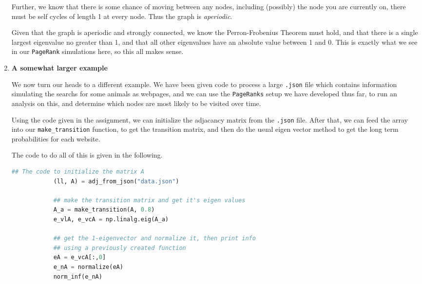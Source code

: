 \documentclass[11pt]{article}
\begin{document}
\begin{enumerate}
        Further, we know that there is some chance of moving between any nodes,
        including (possibly) the node you are currently on, there must be self
        cycles of length 1 at every node. Thus the graph is \textit{aperiodic}.

        Given that the graph is aperiodic and strongly connected, we know the
        Perron-Frobenius Theorem must hold, and that there is a single largest
        eigenvalue no greater than 1, and that all other eigenvalues have an
        absolute value between 1 and 0. This is exactly what we see in our
        \texttt{PageRank} simulations here, so this all makes sense.

    \item \textbf{A somewhat larger example}

        We now turn our heads to a different example. We have been given code
        to process a large \texttt{.json} file which contains information
        simulating the searchs for some animals as webpages, and we can use the
        \texttt{PageRanks} setup we have developed thus far, to run an analysis
        on this, and determine which nodes are most likely to be visited over
        time. 

        Using the code given in the assignment, we can initialize the adjacancy
        matrix from the \texttt{.json} file. After that, we can feed the array
        into our \texttt{make\_transition} function, to get the transition
        matrix, and then do the usual eigen vector method to get the long term
        probabilities for each website.

        The code to do all of this is given in the following.

        \begin{lstlisting}[style=mystyle, linewidth=0.94\linewidth, 
                            language=Python, gobble=8, caption=The analysis]
            ## The code to initialize the matrix A
            (ll, A) = adj_from_json("data.json")

            ## make the transition matrix and get it's eigen values
            A_a = make_transition(A, 0.8)
            e_vlA, e_vcA = np.linalg.eig(A_a)

            ## get the 1-eigenvector and normalize it, then print info
            ## using a previously created function
            eA = e_vcA[:,0]
            e_nA = normalize(eA)
            norm_inf(e_nA)
        \end{lstlisting}


\end{enumerate}
\end{document}
